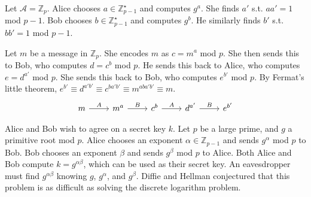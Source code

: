 \begin{example}
    Let $\mathcal A = \mathbb Z_p$.
    Alice chooses $a \in \mathbb Z_{p-1}^\star$ and computes $g^a$.
    She finds $a'$ s.t. $aa' = 1$ mod $p-1$.
    Bob chooses $b \in \mathbb Z_{p-1}^\star$ and computes $g^b$.
    He similarly finds $b'$ s.t. $bb' = 1$ mod $p-1$.

    Let $m$ be a message in $\mathbb Z_p$.
    She encodes $m$ as $c = m^a$ mod $p$.
    She then sends this to Bob, who computes $d = c^b$ mod $p$.
    He sends this back to Alice, who computes $e = d^{a'}$ mod $p$.
    She sends this back to Bob, who computes $e^{b'}$ mod $p$.
    By Fermat's little theorem, $e^{b'} \equiv d^{a'b'} \equiv c^{ba'b'} \equiv m^{aba'b'} \equiv m$.
    \[
        \begin{tikzcd}
            m & {m^a} & {c^b} & {d^{a'}} & {e^{b'}}
            \arrow["A", from=1-1, to=1-2]
            \arrow["B", from=1-2, to=1-3]
            \arrow["A", from=1-3, to=1-4]
            \arrow["B", from=1-4, to=1-5]
        \end{tikzcd}
    \]
\end{example}
\begin{example}
    Alice and Bob wish to agree on a secret key $k$.
    Let $p$ be a large prime, and $g$ a primitive root mod $p$.
    Alice chooses an exponent $\alpha \in \mathbb Z_{p-1}$ and sends $g^\alpha$ mod $p$ to Bob.
    Bob chooses an exponent $\beta$ and sends $g^\beta$ mod $p$ to Alice.
    Both Alice and Bob compute $k = g^{\alpha\beta}$, which can be used as their secret key.
    An eavesdropper must find $g^{\alpha\beta}$ knowing $g$, $g^{\alpha}$, and $g^{\beta}$.
    Diffie and Hellman conjectured that this problem is as difficult as solving the discrete logarithm problem.
\end{example}

